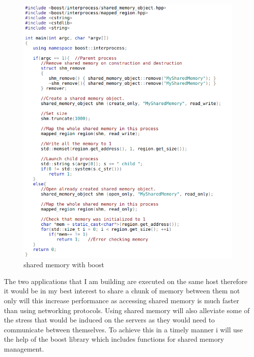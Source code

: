 \begin{figure}[!h]
  \centering
      \includegraphics[width=1\textwidth]{Figures/boost.png}
  \caption[shared memory with boost]{shared memory with boost\cite{boost}}
  \label{fig:boostEzcode}
\end{figure}

\FloatBarrier

The two applications that I am building are executed on the same host therefore it would be in my best interest to share a chunk of memory between them not only will this increase performance as accessing shared memory is much faster than using networking protocols. Using shared memory will also alleviate some of the stress that would be induced on the servers as they would need to communicate between themselves. To achieve this in a timely manner i will use the help of the boost \cite{boost} library which includes functions for shared memory management.

